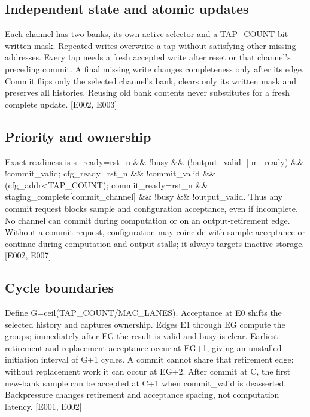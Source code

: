 \documentclass[11pt,a4paper]{article}
\begin{document}
\subsection{Independent state and atomic updates}

Each channel has two banks,\allowbreak{} its own active selector and a TAP\_\allowbreak{}COUNT-bit written mask. Repeated writes overwrite a tap without satisfying other missing addresses. Every tap needs a fresh accepted write after reset or that channel's preceding commit. A final missing write changes completeness only after its edge. Commit flips only the selected channel's bank,\allowbreak{} clears only its written mask and preserves all histories. Reusing old bank contents never substitutes for a fresh complete update. [\allowbreak{}E002,\allowbreak{} E003]\allowbreak{}

\subsection{Priority and ownership}

Exact readiness is s\_\allowbreak{}ready=\allowbreak{}rst\_\allowbreak{}n \&\& !busy \&\& (\allowbreak{}!output\_\allowbreak{}valid || m\_\allowbreak{}ready)\allowbreak{} \&\& !commit\_\allowbreak{}valid; cfg\_\allowbreak{}ready=\allowbreak{}rst\_\allowbreak{}n \&\& !commit\_\allowbreak{}valid \&\& (\allowbreak{}cfg\_\allowbreak{}addr<TAP\_\allowbreak{}COUNT)\allowbreak{}; commit\_\allowbreak{}ready=\allowbreak{}rst\_\allowbreak{}n \&\& staging\_\allowbreak{}complete[\allowbreak{}commit\_\allowbreak{}channel]\allowbreak{} \&\& !busy \&\& !output\_\allowbreak{}valid. Thus any commit request blocks sample and configuration acceptance,\allowbreak{} even if incomplete. No channel can commit during computation or on an output-retirement edge. Without a commit request,\allowbreak{} configuration may coincide with sample acceptance or continue during computation and output stalls; it always targets inactive storage. [\allowbreak{}E002,\allowbreak{} E007]\allowbreak{}

\subsection{Cycle boundaries}

Define G=\allowbreak{}ceil(\allowbreak{}TAP\_\allowbreak{}COUNT/\allowbreak{}MAC\_\allowbreak{}LANES)\allowbreak{}. Acceptance at E0 shifts the selected history and captures ownership. Edges E1 through EG compute the groups; immediately after EG the result is valid and busy is clear. Earliest retirement and replacement acceptance occur at EG+\allowbreak{}1,\allowbreak{} giving an unstalled initiation interval of G+\allowbreak{}1 cycles. A commit cannot share that retirement edge; without replacement work it can occur at EG+\allowbreak{}2. After commit at C,\allowbreak{} the first new-bank sample can be accepted at C+\allowbreak{}1 when commit\_\allowbreak{}valid is deasserted. Backpressure changes retirement and acceptance spacing,\allowbreak{} not computation latency. [\allowbreak{}E001,\allowbreak{} E002]\allowbreak{}
\end{document}
